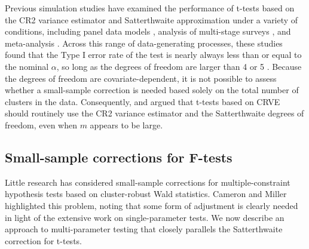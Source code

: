 \documentclass[12pt]{article}\usepackage[]{graphicx}\usepackage[]{color}
\newcommand{\bs}{\boldsymbol}
\begin{document}
Previous simulation studies have examined the performance of t-tests based on the CR2 variance estimator and Satterthwaite approximation under a variety of conditions, including panel data models \citep{Cameron2015practitioners, Imbens2015robust}, analysis of multi-stage surveys \citep{Bell2002bias}, and meta-analysis . Across this range of data-generating processes, these studies found that the Type I error rate of the test is nearly always less than or equal to the nominal $\alpha$, so long as the degrees of freedom are larger than 4 or 5 \citep[][]{Bell2002bias}.
Because the degrees of freedom are covariate-dependent, it is not possible to assess whether a small-sample correction is needed based solely on the total number of clusters in the data. 
Consequently,  and \citet{Imbens2015robust} argued that t-tests based on CRVE should routinely use the CR2 variance estimator and the Satterthwaite degrees of freedom, even when $m$ appears to be large.

\subsection{Small-sample corrections for F-tests}
\label{subsec:F-tests}

Little research has considered small-sample corrections for multiple-constraint hypothesis tests based on cluster-robust Wald statistics.
Cameron and Miller highlighted this problem, noting that some form of adjustment is clearly needed in light of the extensive work on single-parameter tests.
We now describe an approach to multi-parameter testing that closely parallels the Satterthwaite correction for t-tests.
\end{document}
